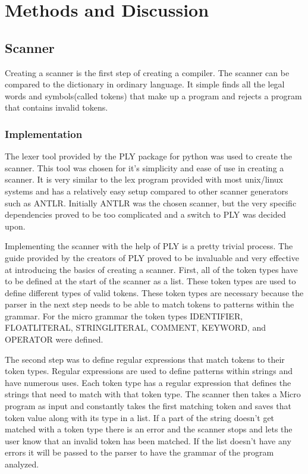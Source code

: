 \documentclass[12pt, oneside]{article}   	%
\begin{document}
\section{Methods and Discussion}
\subsection{Scanner}
Creating a scanner is the first step of creating a compiler. The scanner can be compared to 
the dictionary in ordinary language. It simple finds all the legal words and symbols(called tokens) 
that make up a program and rejects a program that contains invalid tokens.

\subsubsection{Implementation}
The lexer tool provided by the PLY package for python was used to create the scanner. This tool was chosen for it's simplicity and ease of use in creating a scanner. It is very similar to the lex program provided with most unix/linux systems and has a relatively easy setup compared to other scanner generators such as ANTLR.
Initially ANTLR was the chosen scanner, but the very specific dependencies proved to be too complicated and a switch to PLY was decided upon. 

Implementing the scanner with the help of PLY is a pretty trivial process. The guide
provided by the creators of PLY proved to be invaluable and very effective at
introducing the basics of creating a scanner. First, all of the token types have to be defined at the start of the scanner as a
list. These token types are used to define different types of valid tokens. These token types are necessary because the parser in the next step needs to be able to match tokens to patterns within the grammar. For the micro  grammar the token types IDENTIFIER, FLOATLITERAL, STRINGLITERAL, COMMENT, KEYWORD, and OPERATOR were defined.

The second step was to define regular expressions that match tokens to their token types. Regular expressions are used to define patterns within strings and have numerous uses. Each token type has a regular expression that defines the strings that need to match with that token type. The scanner then takes a Micro program as input and constantly takes
the first matching token and saves that token value along with its type in a list. If a part of the string doesn't get matched with a token type there is an error and the scanner stops and lets the user know that an invalid token has been
matched. If the list doesn't have any errors it will be passed to the parser to have the grammar of the program analyzed. 
\end{document}
